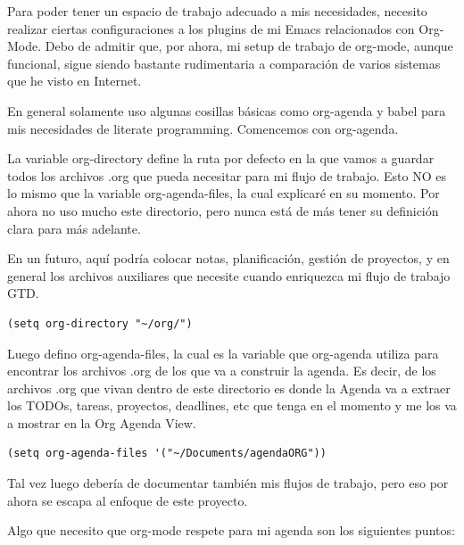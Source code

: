 \documentclass[11pt]{article}
\begin{document}
Para poder tener un espacio de trabajo adecuado a mis necesidades, necesito realizar ciertas configuraciones a los plugins de mi Emacs relacionados con Org-Mode. Debo de admitir que, por ahora, mi setup de trabajo de org-mode, aunque funcional, sigue siendo bastante rudimentaria a comparación de varios sistemas que he visto en Internet.

En general solamente uso algunas cosillas básicas como org-agenda y babel para mis necesidades de literate programming. Comencemos con org-agenda.

La variable org-directory define la ruta por defecto en la que vamos a guardar todos los archivos .org que pueda necesitar para mi flujo de trabajo. Esto NO es lo mismo que la variable org-agenda-files, la cual explicaré en su momento. Por ahora no uso mucho este directorio, pero nunca está de más tener su definición clara para más adelante.

En un futuro, aquí podría colocar notas, planificación, gestión de proyectos, y en general los archivos auxiliares que necesite cuando enriquezca mi flujo de trabajo GTD.

\begin{verbatim}
(setq org-directory "~/org/")
\end{verbatim}

Luego defino org-agenda-files, la cual es la variable que org-agenda utiliza para encontrar los archivos .org de los que va a construir la agenda. Es decir, de los archivos .org que vivan dentro de este directorio es donde la Agenda va a extraer los TODOs, tareas, proyectos, deadlines, etc que tenga en el momento y me los va a mostrar en la Org Agenda View.

\begin{verbatim}
(setq org-agenda-files '("~/Documents/agendaORG"))
\end{verbatim}

Tal vez luego debería de documentar también mis flujos de trabajo, pero eso por ahora se escapa al enfoque de este proyecto.

Algo que necesito que org-mode respete para mi agenda son los siguientes puntos:
\end{document}
